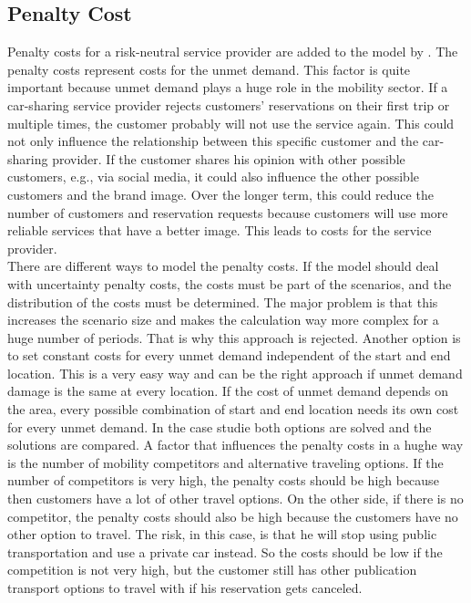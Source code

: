 \subsection{Penalty Cost}
Penalty costs for a risk-neutral service provider are added to the model by \cite{Wei_1}. The penalty costs represent costs for the unmet demand. This factor is quite important because unmet demand plays a huge role in the mobility sector. If a car-sharing service provider rejects customers' reservations on their first trip or multiple times, the customer probably will not use the service again. This could not only influence the relationship between this specific customer and the car-sharing provider. If the customer shares his opinion with other possible customers, e.g., via social media, it could also influence the other possible customers and the brand image. Over the longer term, this could reduce the number of customers and reservation requests because customers will use more reliable services that have a better image. This leads to costs for the service provider.\\
There are different ways to model the penalty costs. If the model should deal with uncertainty penalty costs, the costs must be part of the scenarios, and the distribution of the costs must be determined. The major problem is that this increases the scenario size and makes the calculation way more complex for a huge number of periods. That is why this approach is rejected. Another option is to set constant costs for every unmet demand independent of the start and end location. This is a very easy way and can be the right approach if unmet demand damage is the same at every location. If the cost of unmet demand depends on the area, every possible combination of start and end location needs its own cost for every unmet demand. In the case studie both options are solved and the solutions are compared. A factor that influences the penalty costs in a hughe way is the number of mobility competitors and alternative traveling options. If the number of competitors is very high, the penalty costs should be high because then customers have a lot of other travel options. On the other side, if there is no competitor, the penalty costs should also be high because the customers have no other option to travel. The risk, in this case, is that he will stop using public transportation and use a private car instead. So the costs should be low if the competition is not very high, but the customer still has other publication transport options to travel with if his reservation gets canceled.
